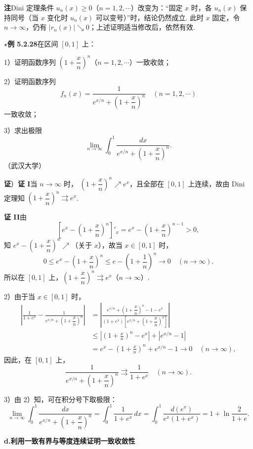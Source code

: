 \documentclass[UTF8,12pt,a4paper,fontset=fandol]{ctexart}
\begin{document}
\noindent\textbf{注}\quad Dini 定理条件 $u_n(x)\ge0$（$n=1,2,\cdots$）改变为：“固定 $x$ 时，各
$u_n(x)$ 保持同号（当 $x$ 变化时 $u_n(x)$ 可以变号）”时，结论仍然成立. 此时 $x$ 固定，令
$n\to\infty$，仍有 $|r_n(x)|\searrow0$；上述证明适当修改后，依然有效.

\noindent\textbf{$\star$例 5.2.28}\quad 在区间 $[0,1]$ 上：

1）证明函数序列 $\left(1+\dfrac{x}{n}\right)^n$（$n=1,2,\cdots$）一致收敛；

2）证明函数序列
\[
  f_n(x)=\frac1{e^{x/n}+\left(1+\dfrac{x}{n}\right)^n}\quad(n=1,2,\cdots)
\]
一致收敛；

3）求出极限
\[
  \lim_{n\to\infty}\int_0^1
  \frac{dx}{e^{x/n}+\left(1+\dfrac{x}{n}\right)^n}.
\]
（武汉大学）

\noindent\textbf{证}）\textbf{证 I}\quad 当 $n\to\infty$ 时，
$\left(1+\dfrac{x}{n}\right)^n\nearrow e^x$，且全部在 $[0,1]$ 上连续，故由 Dini 定理知
$\left(1+\dfrac{x}{n}\right)^n\rightrightarrows e^x$.

\noindent\textbf{证 II}\quad 由
\[
  \left[e^x-\left(1+\frac{x}{n}\right)^n\right]'_x
  =e^x-\left(1+\frac{x}{n}\right)^{n-1}>0,
\]
知 $e^x-\left(1+\dfrac{x}{n}\right)^n\nearrow$（关于 $x$），故当 $x\in[0,1]$ 时，
\[
  0\le e^x-\left(1+\frac{x}{n}\right)^n
  \le e-\left(1+\frac1n\right)^n\to0\quad(n\to\infty).
\]
所以在 $[0,1]$ 上，$\left(1+\dfrac{x}{n}\right)^n\rightrightarrows e^x$（$n\to\infty$）.

2）由于当 $x\in[0,1]$ 时，
\[
\begin{aligned}
  \left|\frac1{1+e^x}
  -\frac1{e^{x/n}+\left(1+\dfrac{x}{n}\right)^n}\right|
  &=
  \left|\frac{e^{x/n}+\left(1+\dfrac{x}{n}\right)^n-1-e^x}
  {(1+e^x)\left[e^{x/n}+\left(1+\dfrac{x}{n}\right)^n\right]}\right|\\
  &\le \left|\left(1+\frac{x}{n}\right)^n-e^x\right|+|e^{x/n}-1|\\
  &=e^x-\left(1+\frac{x}{n}\right)^n+e^{x/n}-1\to0\quad(n\to\infty),
\end{aligned}
\]
因此，在 $[0,1]$ 上，
\[
  \frac1{e^{x/n}+\left(1+\dfrac{x}{n}\right)^n}
  \rightrightarrows\frac1{1+e^x}\quad(n\to\infty).
\]

3）由 2）知，可在积分号下取极限：
\[
  \lim_{n\to\infty}\int_0^1
  \frac{dx}{e^{x/n}+\left(1+\dfrac{x}{n}\right)^n}
  =\int_0^1\frac1{1+e^x}\,dx
  =\int_0^1\frac{d(e^x)}{e^x(1+e^x)}
  =1+\ln\frac2{1+e}.
\]

\noindent\textbf{d.\quad 利用一致有界与等度连续证明一致收敛性}
\end{document}
